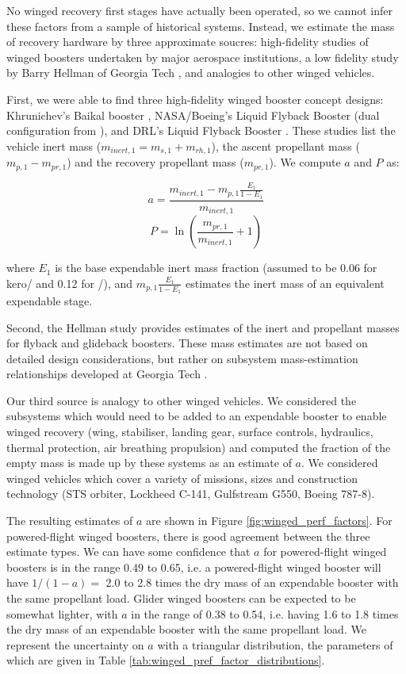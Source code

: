 \documentclass[conf]{../paper/new-aiaa}
\begin{document}
No winged recovery first stages have actually been operated, so we cannot infer these factors from a sample of historical systems. Instead, we estimate the mass of recovery hardware by three approximate soucres: high-fidelity studies of winged boosters undertaken by major aerospace institutions, a low fidelity study by Barry Hellman of Georgia Tech \cite{Hellman2005}, and analogies to other winged vehicles.

First, we were able to find three high-fidelity winged booster concept designs: Khrunichev's Baikal booster \cite{Isakowitz2004}, NASA/Boeing's Liquid Flyback Booster (dual configuration from \cite{Healy1998}), and DRL's Liquid Flyback Booster \cite{Sippel2003}. These studies list the vehicle inert mass ($m_{inert,1} = m_{s,1} + m_{rh,1}$), the ascent propellant mass ($m_{p,1} - m_{pr,1}$) and the recovery propellant mass ($m_{pr,1}$). We compute $a$ and $P$ as:

\[
a = \frac{m_{inert,1} - m_{p,1} \frac{E_1}{1 - E_1}}{m_{inert,1}}
\]
\[
P = \ln\left( \frac{m_{pr,1}}{m_{inert,1}} + 1 \right)
\]

where $E_1$ is the base expendable inert mass fraction (assumed to be 0.06 for kero/ and 0.12 for /), and $m_{p,1} \frac{E_1}{1 - E_1}$ estimates the inert mass of an equivalent expendable stage.

Second, the Hellman study provides estimates of the inert and propellant masses for flyback and glideback boosters. These mass estimates are not based on detailed design considerations, but rather on subsystem mass-estimation relationships developed at Georgia Tech \cite{Rohrschneider2002}.

Our third source is analogy to other winged vehicles. We considered the subsystems which would need to be added to an expendable booster to enable winged recovery (wing, stabiliser, landing gear, surface controls, hydraulics, thermal protection, air breathing propulsion) and computed the fraction of the empty mass is made up by these systems as an estimate of $a$. We considered winged vehicles which cover a variety of missions, sizes and construction technology (STS orbiter, Lockheed C-141, Gulfstream G550, Boeing 787-8).

The resulting estimates of $a$ are shown in Figure \ref{fig:winged_perf_factors}. For powered-flight winged boosters, there is good agreement between the three estimate types. We can have some confidence that $a$ for powered-flight winged boosters is in the range 0.49 to 0.65, i.e. a powered-flight winged booster will have $1/(1-a) =$ 2.0 to 2.8 times the dry mass of an expendable booster with the same propellant load. Glider winged boosters can be expected to be somewhat lighter, with $a$ in the range of 0.38 to 0.54, i.e. having 1.6 to 1.8 times the dry mass of an expendable booster with the same propellant load. We represent the uncertainty on $a$ with a triangular distribution, the parameters of which are given in Table \ref{tab:winged_pref_factor_distributions}.
\end{document}
